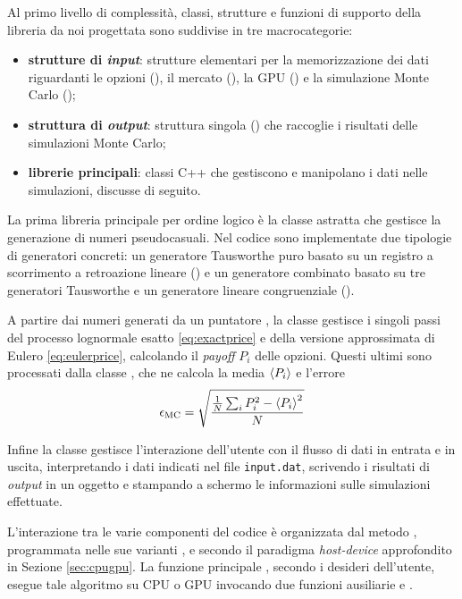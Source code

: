 Al primo livello di complessità, classi, strutture e funzioni di supporto della libreria da noi progettata sono suddivise in tre macrocategorie:

\begin{itemize}
    \item \textbf{strutture di \textit{input}}: strutture elementari per la memorizzazione dei dati riguardanti le opzioni (), il mercato (), la GPU () e la simulazione Monte Carlo ();
    \item \textbf{struttura di \textit{output}}: struttura singola () che raccoglie i risultati delle simulazioni Monte Carlo;
    \item \textbf{librerie principali}: classi C++ che gestiscono e manipolano i dati nelle simulazioni, discusse di seguito.
\end{itemize}

La prima libreria principale per ordine logico è la classe astratta  che gestisce la generazione di numeri pseudocasuali. Nel codice sono implementate due tipologie di generatori concreti: un generatore Tausworthe puro basato su un registro a scorrimento a retroazione lineare () e un generatore combinato basato su tre generatori Tausworthe e un generatore lineare congruenziale ().

A partire dai numeri generati da un puntatore , la classe  gestisce i singoli passi del processo lognormale esatto \eqref{eq:exactprice} e della versione approssimata di Eulero \eqref{eq:eulerprice}, calcolando il \textit{payoff} $P_i$ delle opzioni. Questi ultimi sono processati dalla classe , che ne calcola la media $\braket{P_i}$ e l'errore
\begin{equation}
    \epsilon_\text{MC} = \sqrt{\frac{\frac{1}{N}\sum_i{P_i^2} - \braket{P_i}^2}{N}}
    \label{eq:mcerror}
\end{equation}

Infine la classe  gestisce l'interazione dell'utente con il flusso di dati in entrata e in uscita, interpretando i dati indicati nel file \verb|input.dat|, scrivendo i risultati di \textit{output} in un oggetto  e stampando a schermo le informazioni sulle simulazioni effettuate.

L'interazione tra le varie componenti del codice è organizzata dal metodo  , programmata nelle sue varianti ,  e  secondo il paradigma \textit{host-device} approfondito in Sezione \ref{sec:cpugpu}. La funzione principale , secondo i desideri dell'utente, esegue tale algoritmo su CPU o GPU invocando due funzioni ausiliarie  e .

